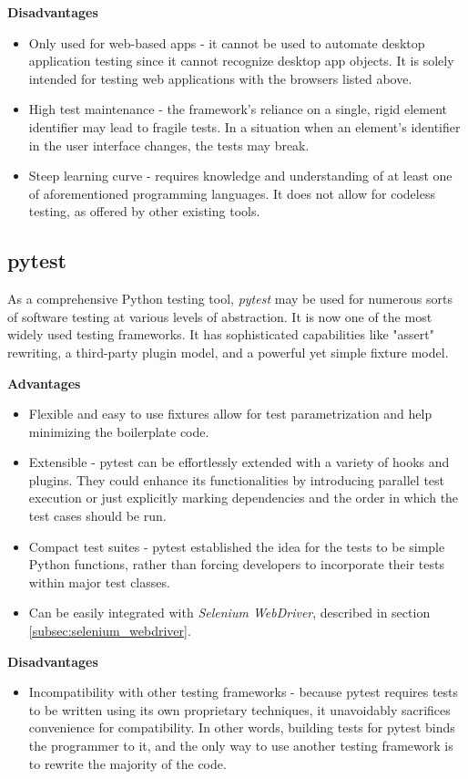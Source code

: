 \textbf{Disadvantages}
\begin{itemize}
    \item Only used for web-based apps - it cannot be used to automate desktop application testing since it cannot recognize desktop app objects. It is solely intended for testing web applications with the browsers listed above.
    \item High test maintenance - the framework's reliance on a single, rigid element identifier may lead to fragile tests. In a situation when an element's identifier in the user interface changes, the tests may break.
    \item Steep learning curve - requires knowledge and understanding  of at least one of aforementioned programming languages. It does not allow for codeless testing, as offered by other existing tools.
\end{itemize}

\subsection{pytest}\label{subsec:pytest}

As a comprehensive Python testing tool, \textit{pytest} \cite{pytest} may be used for numerous sorts of software testing at various levels of abstraction. It is now one of the most widely used testing frameworks. It has sophisticated capabilities like "assert" rewriting, a third-party plugin model, and a powerful yet simple fixture model.

\textbf{Advantages}
\begin{itemize}
    \item Flexible and easy to use fixtures allow for test parametrization and help minimizing the boilerplate code.
    \item Extensible - pytest can be effortlessly extended with a variety of hooks and plugins. They could enhance its functionalities by introducing parallel test execution or just explicitly marking dependencies and the order in which the test cases should be run.
    \item Compact test suites - pytest established the idea for the tests to be simple Python functions, rather than forcing developers to incorporate their tests within major test classes.
    \item Can be easily integrated with \textit{Selenium WebDriver}, described in section \ref{subsec:selenium_webdriver}.
\end{itemize}

\textbf{Disadvantages}
\begin{itemize}
    \item Incompatibility with other testing frameworks - because pytest requires tests to be written using its own proprietary techniques, it unavoidably sacrifices convenience for compatibility. In other words, building tests for pytest binds the programmer to it, and the only way to use another testing framework is to rewrite the majority of the code.
\end{itemize}

